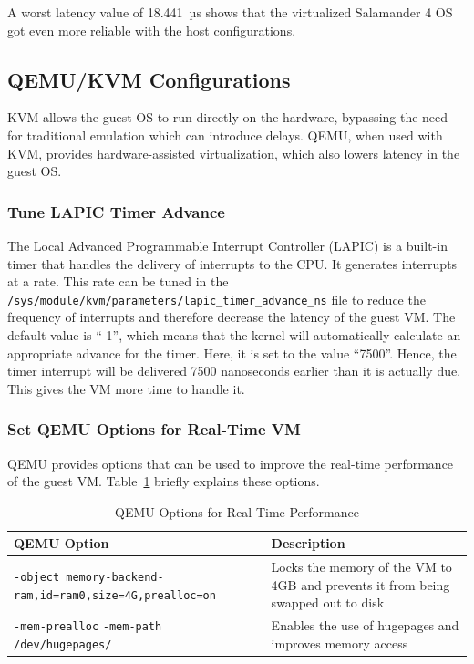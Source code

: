 \documentclass[MMR,Master,english]{style/twbook}
\begin{document}
\noindent A worst latency value of 18.441~µs shows that the virtualized Salamander 4 OS got even more reliable with the host configurations.

\clearpage

\subsection{QEMU/KVM Configurations}\label{subsec:qemu_configurations}
KVM allows the guest OS to run directly on the hardware, bypassing the need for traditional emulation which can introduce delays. QEMU, when used with KVM, provides hardware-assisted virtualization, which also lowers latency in the guest OS.

\subsubsection{Tune LAPIC Timer Advance}
The Local Advanced Programmable Interrupt Controller (LAPIC) is a built-in timer that handles the delivery of interrupts to the CPU. It generates interrupts at a rate. This rate can be tuned in the \texttt{/sys/module/kvm/parameters/lapic\_timer\_advance\_ns} file to reduce the frequency of interrupts and therefore decrease the latency of the guest VM. The default value is ``-1'', which means that the kernel will automatically calculate an appropriate advance for the timer. Here, it is set to the value ``7500''. Hence, the timer interrupt will be delivered 7500 nanoseconds earlier than it is actually due. This gives the VM more time to handle it.

\subsubsection{Set QEMU Options for Real-Time VM}
QEMU provides options that can be used to improve the real-time performance of the guest VM. Table~\ref{tab:qemu_options} briefly explains these options.

\begin{table}[H]
	\centering
	\caption{QEMU Options for Real-Time Performance}
	\label{tab:qemu_options}
	\setlength{\tabcolsep}{0.5em} %
	{\renewcommand{\arraystretch}{1.2}%
		\begin{tabular}{|p{6.5cm}|p{8cm}|}
			\hline
			\textbf{QEMU Option}                                                             & \textbf{Description}                                                             \\\hline
			\texttt{-object memory-backend-ram,}\newline\texttt{id=ram0,size=4G,prealloc=on} & Locks the memory of the VM to 4GB and prevents it from being swapped out to disk \\\hline
			\texttt{-mem-prealloc} \newline \texttt{-mem-path /dev/hugepages/}               & Enables the use of hugepages and improves \newline memory access                 \\\hline
		\end{tabular}}
\end{table}
\end{document}
